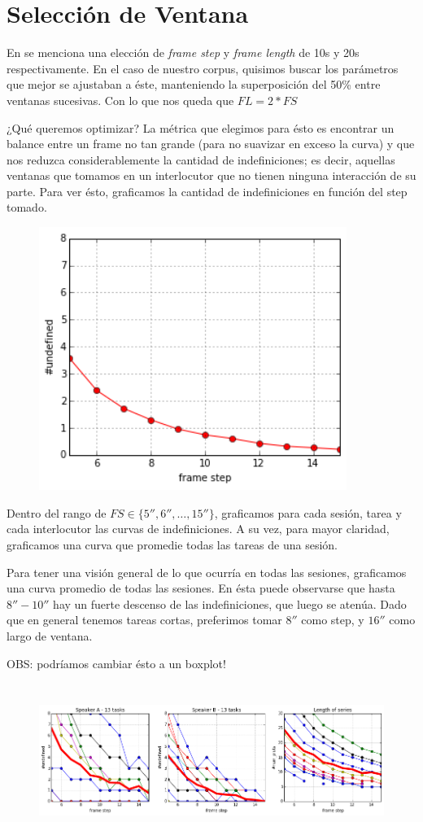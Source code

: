 \section{Selección de Ventana}
\label{sec:window_selection}
En \cite{KOU2009} se menciona una elección de \emph{frame step} y \emph{frame length} de 10s y 20s respectivamente. En el caso de nuestro corpus, quisimos buscar los parámetros que mejor se ajustaban a éste, manteniendo la superposición del 50\% entre ventanas sucesivas. Con lo que nos queda que $FL = 2 * FS$

¿Qué queremos optimizar? La métrica que elegimos para ésto es encontrar un balance entre un frame no tan grande (para no suavizar en exceso la curva) y que nos reduzca considerablemente la cantidad de indefiniciones; es decir, aquellas ventanas que tomamos en un interlocutor que no tienen ninguna interacción de su parte. Para ver ésto, graficamos la cantidad de indefiniciones en función del step tomado.

\begin{figure}
\centering
\includegraphics[width=10cm]{images/window_selection.png}
\end{figure}



Dentro del rango de $FS \in \{5'',6'', \ldots ,15'' \}$, graficamos para cada sesión, tarea y cada interlocutor las curvas de indefiniciones. A su vez, para mayor claridad, graficamos una curva que promedie todas las tareas de una sesión.


Para tener una visión general de lo que ocurría en todas las sesiones, graficamos una curva promedio de todas las sesiones. En ésta puede observarse que hasta $8''-10''$ hay un fuerte descenso de las indefiniciones, que luego se atenúa. Dado que en general tenemos tareas cortas, preferimos tomar $8''$ como step, y $16''$ como largo de ventana.

OBS: podríamos cambiar ésto a un boxplot!

\begin{figure}
\centering
\includegraphics[height=5cm]{images/window_selection_for_session.png}
\end{figure}
